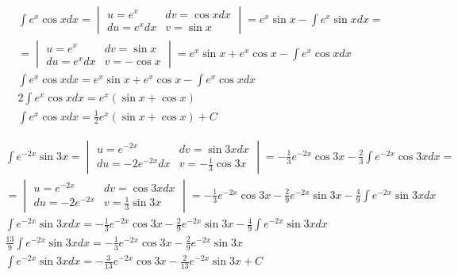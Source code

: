\begin{gather*}
  \int e^x\cos x dx =
  \begin{vmatrix}
    u=e^x & dv=\cos x dx \\
    du=e^x dx & v=\sin x
  \end{vmatrix}
  = e^x\sin x - \int e^x \sin x dx = \\
  = \begin{vmatrix}
    u=e^x & dv=\sin x \\
    du=e^xdx & v=-\cos x
  \end{vmatrix}
  = e^x\sin x + e^x\cos x - \int e^x\cos x dx \\
  \int e^x\cos x dx = e^x\sin x + e^x\cos x - \int e^x\cos x dx \\
  2 \int e^x\cos x dx = e^x (\sin x + \cos x) \\
  \int e^x\cos x dx = \frac{1}{2}e^x (\sin x + \cos x)+C
\end{gather*}


\begin{gather*}
  \int e^{-2x} \sin 3x =
  \begin{vmatrix}
    u=e^{-2x} & dv=\sin 3x dx \\
    du=-2e^{-2x}dx & v=-\frac{1}{3}\cos 3x
  \end{vmatrix}
  = -\frac{1}{3}e^{-2x}\cos 3x - \frac{2}{3} \int e^{-2x}\cos 3x dx = \\
  = \begin{vmatrix}
    u=e^{-2x} & dv=\cos 3x dx \\
    du=-2e^{-2x} & v=\frac{1}{3}\sin 3x
  \end{vmatrix}
  = -\frac{1}{3}e^{-2x}\cos 3x - \frac{2}{9}e^{-2x}\sin 3x - \frac{4}{9}\int e^{-2x}\sin 3x dx \\
  \int e^{-2x} \sin 3x dx= -\frac{1}{3}e^{-2x}\cos 3x - \frac{2}{9}e^{-2x}\sin 3x - \frac{4}{9}\int e^{-2x}\sin 3x dx \\
  \frac{13}{9} \int e^{-2x} \sin 3x dx = -\frac{1}{3}e^{-2x}\cos 3x - \frac{2}{9}e^{-2x}\sin 3x \\
  \int e^{-2x} \sin 3x dx = -\frac{3}{13}e^{-2x}\cos 3x - \frac{2}{13}e^{-2x}\sin 3x+C
\end{gather*}




